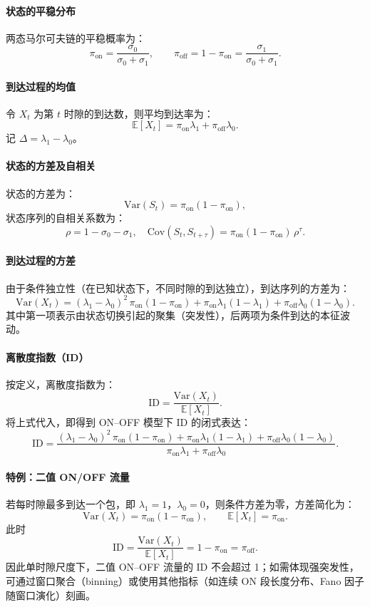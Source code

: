 \paragraph{状态的平稳分布}
两态马尔可夫链的平稳概率为：
\[
\pi_{\mathrm{on}} = \frac{\sigma_0}{\sigma_0 + \sigma_1}, \qquad
\pi_{\mathrm{off}} = 1 - \pi_{\mathrm{on}} = \frac{\sigma_1}{\sigma_0 + \sigma_1}.
\]

\paragraph{到达过程的均值}
令 $X_t$ 为第 $t$ 时隙的到达数，则平均到达率为：
\[
\mathbb{E}[X_t] = \pi_{\mathrm{on}} \lambda_1 + \pi_{\mathrm{off}} \lambda_0.
\]
记 $\Delta = \lambda_1 - \lambda_0$。

\paragraph{状态的方差及自相关}
状态的方差为：
\[
\mathrm{Var}(S_t) = \pi_{\mathrm{on}} (1 - \pi_{\mathrm{on}}),
\]
状态序列的自相关系数为：
\[
\rho = 1 - \sigma_0 - \sigma_1, \quad
\mathrm{Cov}(S_t, S_{t+\tau}) = \pi_{\mathrm{on}} (1 - \pi_{\mathrm{on}}) \, \rho^{\tau}.
\]

\paragraph{到达过程的方差}
由于条件独立性（在已知状态下，不同时隙的到达独立），到达序列的方差为：
\[
\mathrm{Var}(X_t) = (\lambda_1 - \lambda_0)^2 \, \pi_{\mathrm{on}} (1 - \pi_{\mathrm{on}}) 
+ \pi_{\mathrm{on}} \lambda_1 (1 - \lambda_1) + \pi_{\mathrm{off}} \lambda_0 (1 - \lambda_0).
\]
其中第一项表示由状态切换引起的聚集（突发性），后两项为条件到达的本征波动。

\paragraph{离散度指数（ID）}
按定义，离散度指数为：
\[
\mathrm{ID} = \frac{\mathrm{Var}(X_t)}{\mathbb{E}[X_t]}.
\]
将上式代入，即得到 ON--OFF 模型下 ID 的闭式表达：
\[
\mathrm{ID} = \frac{
	(\lambda_1 - \lambda_0)^2 \, \pi_{\mathrm{on}} (1 - \pi_{\mathrm{on}}) 
	+ \pi_{\mathrm{on}} \lambda_1 (1 - \lambda_1) + \pi_{\mathrm{off}} \lambda_0 (1 - \lambda_0)
}{
	\pi_{\mathrm{on}} \lambda_1 + \pi_{\mathrm{off}} \lambda_0
}.
\]

\paragraph{特例：二值 ON/OFF 流量}
若每时隙最多到达一个包，即 $\lambda_1=1$，$\lambda_0=0$，则条件方差为零，方差简化为：
\[
\mathrm{Var}(X_t) = \pi_{\mathrm{on}} (1 - \pi_{\mathrm{on}}), \qquad
\mathbb{E}[X_t] = \pi_{\mathrm{on}}.
\]
此时
\[
\mathrm{ID} = \frac{\mathrm{Var}(X_t)}{\mathbb{E}[X_t]} = 1 - \pi_{\mathrm{on}} = \pi_{\mathrm{off}}.
\]
因此单时隙尺度下，二值 ON--OFF 流量的 ID 不会超过 1；如需体现强突发性，可通过窗口聚合（binning）或使用其他指标（如连续 ON 段长度分布、Fano 因子随窗口演化）刻画。

